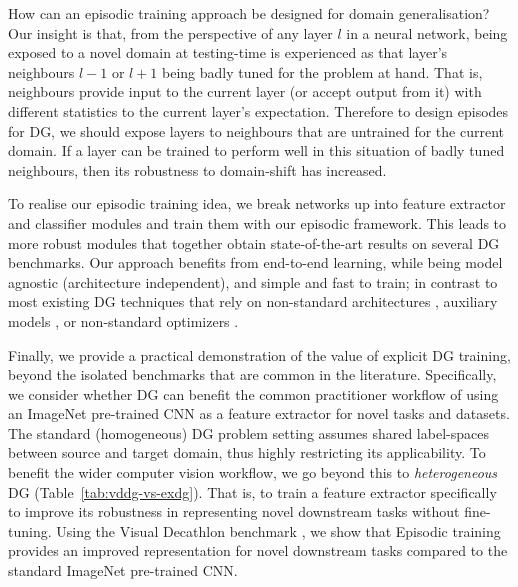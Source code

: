 \documentclass[10pt,twocolumn,letterpaper]{article}
\begin{document}
How can an episodic training approach be designed for domain generalisation? Our insight is that, from the perspective of any layer $l$ in a neural network, being exposed to a novel domain at testing-time is experienced as that layer's neighbours $l-1$ or $l+1$ being badly tuned for the problem at hand. That is,  neighbours provide input to the current layer (or accept output from it) with different statistics to the current layer's expectation. Therefore to design episodes for DG, we should expose layers to neighbours that are untrained for the current domain. If a layer can be trained to perform  well in this situation of badly tuned neighbours, then its robustness to domain-shift has increased. 

To realise our episodic training idea, we break networks up into feature extractor and classifier modules and train them with our episodic framework. This leads to more robust modules that together obtain state-of-the-art results on several DG benchmarks. Our approach benefits from end-to-end learning, while being model agnostic (architecture independent), and simple and fast to train; in contrast to most existing DG techniques that rely on non-standard architectures \cite{Li2017dg}, auxiliary models \cite{shankar2018generalizing}, or non-standard optimizers \cite{Li2018MLDG}.  

Finally, we provide a practical demonstration of the value of explicit DG training, beyond the isolated benchmarks that are common in the literature. Specifically, we consider whether DG can benefit the common practitioner workflow of using an ImageNet \cite{russakovsky2015ilsvrc} pre-trained CNN as a feature extractor for novel tasks and datasets. The standard (homogeneous) DG problem setting assumes shared label-spaces between source and target domain, thus highly restricting its applicability. To benefit the wider computer vision workflow, we go beyond this to \emph{heterogeneous} DG (Table~\ref{tab:vddg-vs-exdg}). That is, to train a feature extractor specifically to improve its robustness in representing novel downstream tasks without fine-tuning. Using the Visual Decathlon benchmark \cite{Rebuffi17}, we show that Episodic training provides an improved representation for novel downstream tasks compared to the standard ImageNet pre-trained CNN.
\end{document}

